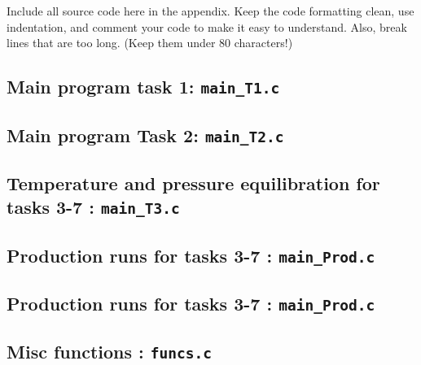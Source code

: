 Include all source code here in the appendix. Keep the code formatting clean,
use indentation, and comment your code to make it easy to understand. Also,
break lines that are too long. (Keep them under 80 characters!)

%

%

\subsection{Main program task 1: \texttt{main\_T1.c}}


\subsection{Main program  Task 2: \texttt{main\_T2.c}}


\subsection{Temperature and pressure equilibration for tasks 3-7 : \texttt{main\_T3.c}}


\subsection{Production runs for tasks 3-7 : \texttt{main\_Prod.c}}


\subsection{Production runs for tasks 3-7 : \texttt{main\_Prod.c}}



\subsection{Misc functions : \texttt{funcs.c}}


